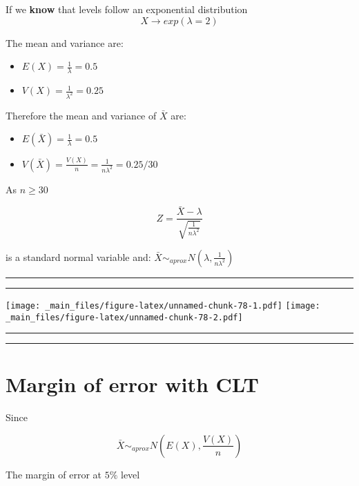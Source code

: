 \documentclass[
]{book}
\providecommand{\tightlist}{%
  \setlength{\itemsep}{0pt}\setlength{\parskip}{0pt}}
\begin{document}
If we \textbf{know} that levels follow an exponential distribution \[X \rightarrow exp(\lambda=2)\]

The mean and variance are:

\begin{itemize}
\tightlist
\item
  \(E(X)=\frac{1}{\lambda}=0.5\)
\item
  \(V(X)=\frac{1}{\lambda^2}=0.25\)
\end{itemize}

Therefore the mean and variance of \(\bar{X}\) are:

\begin{itemize}
\tightlist
\item
  \(E(\bar{X})=\frac{1}{\lambda}=0.5\)
\item
  \(V(\bar{X})=\frac{V(X)}{n}=\frac{1}{n\lambda^2}=0.25/30\)
\end{itemize}

As \(n \geq 30\)

\[Z=\frac{\bar{X}-\lambda}{\sqrt{\frac{1}{n\lambda^2}}}\]

is a standard normal variable and: \(\bar{X} \sim_{aprox} N(\lambda, \frac{1}{n\lambda^2})\)

\begin{center}\rule{0.5\linewidth}{0.5pt}\end{center}

\begin{center}\rule{0.5\linewidth}{0.5pt}\end{center}

\texttt{[image: \_main\_files/figure-latex/unnamed-chunk-78-1.pdf]} \texttt{[image: \_main\_files/figure-latex/unnamed-chunk-78-2.pdf]}

\begin{center}\rule{0.5\linewidth}{0.5pt}\end{center}

\begin{center}\rule{0.5\linewidth}{0.5pt}\end{center}

\hypertarget{margin-of-error-with-clt}{%
\section{Margin of error with CLT}\label{margin-of-error-with-clt}}

Since

\[\bar{X} \sim_{aprox}  N(E(X), \frac{V(X)}{n})\]

The margin of error at \(5\%\) level
\end{document}
